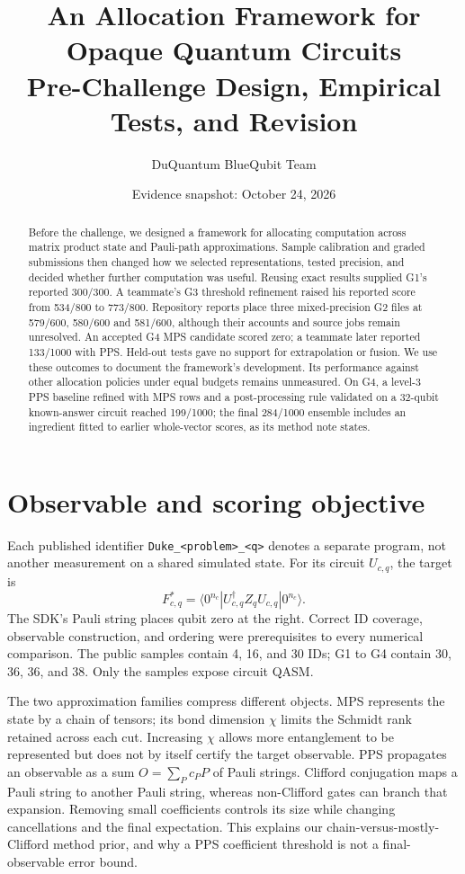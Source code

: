 \documentclass[11pt]{article}
\title{\vspace{-1.1cm}An Allocation Framework for Opaque Quantum Circuits\\\large Pre-Challenge Design, Empirical Tests, and Revision}
\author{DuQuantum BlueQubit Team}
\date{Evidence snapshot: October 24, 2026}
\newcommand{\file}[1]{\nolinkurl{#1}}
\begin{document}
\maketitle
\vspace{-1em}
\begin{abstract}
Before the challenge, we designed a framework for allocating computation across matrix product state and Pauli-path approximations. Sample calibration and graded submissions then changed how we selected representations, tested precision, and decided whether further computation was useful. Reusing exact results supplied G1's reported 300/300. A teammate's G3 threshold refinement raised his reported score from 534/800 to 773/800. Repository reports place three mixed-precision G2 files at 579/600, 580/600 and 581/600, although their accounts and source jobs remain unresolved. An accepted G4 MPS candidate scored zero; a teammate later reported 133/1000 with PPS. Held-out tests gave no support for extrapolation or fusion. We use these outcomes to document the framework's development. Its performance against other allocation policies under equal budgets remains unmeasured. On G4, a level-3 PPS baseline refined with MPS rows and a post-processing rule validated on a 32-qubit known-answer circuit reached 199/1000; the final 284/1000 ensemble includes an ingredient fitted to earlier whole-vector scores, as its method note states.
\end{abstract}

\section{Observable and scoring objective}
Each published identifier \file{Duke_<problem>_<q>} denotes a separate program, not another measurement on a shared simulated state. For its circuit $U_{c,q}$, the target is
\begin{equation}
 F^*_{c,q}=\langle 0^{n_c}|U_{c,q}^{\dagger}Z_qU_{c,q}|0^{n_c}\rangle.
\end{equation}
The SDK's Pauli string places qubit zero at the right. Correct ID coverage, observable construction, and ordering were prerequisites to every numerical comparison. The public samples contain 4, 16, and 30 IDs; G1 to G4 contain 30, 36, 36, and 38. Only the samples expose circuit QASM.\cite{challenge}

The two approximation families compress different objects. MPS represents the state by a chain of tensors; its bond dimension $\chi$ limits the Schmidt rank retained across each cut. Increasing $\chi$ allows more entanglement to be represented but does not by itself certify the target observable. PPS propagates an observable as a sum $O=\sum_P c_P P$ of Pauli strings. Clifford conjugation maps a Pauli string to another Pauli string, whereas non-Clifford gates can branch that expansion. Removing small coefficients controls its size while changing cancellations and the final expectation. This explains our chain-versus-mostly-Clifford method prior, and why a PPS coefficient threshold is not a final-observable error bound.\cite{design,teammate-1}
\end{document}
